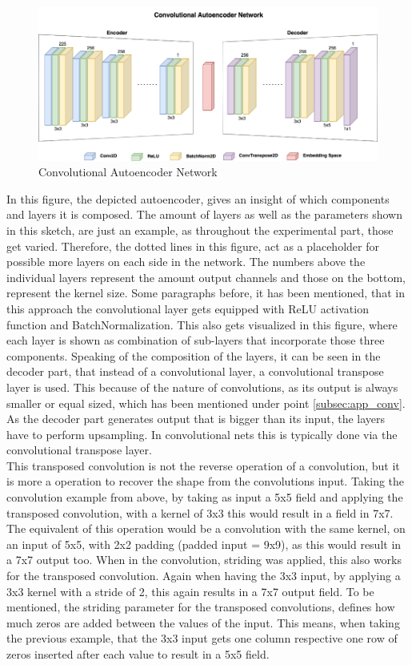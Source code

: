 \begin{figure}[htb!]
	\caption{Convolutional Autoencoder Network}
	\label{fig:app_autoencoder}
	\centering
	\includegraphics[width=\textwidth]{images/approach/autoencoder.png}
\end{figure}

In this figure, the depicted autoencoder, gives an insight of which components and layers it is composed. The amount of layers as well as the parameters shown in this sketch, are just an example, as throughout the experimental part, those get varied. Therefore, the dotted lines in this figure, act as a placeholder for possible more layers on each side in the network. The numbers above the individual layers represent the amount output channels and those on the bottom, represent the kernel size. Some paragraphs before, it has been mentioned, that in this approach the convolutional layer gets equipped with ReLU activation function and BatchNormalization. This also gets visualized in this figure, where each layer is shown as combination of sub-layers that incorporate those three components. Speaking of the composition of the layers, it can be seen in the decoder part, that instead of a convolutional layer, a convolutional transpose layer is used. This because of the nature of convolutions, as its output is always smaller or equal sized, which has been mentioned under point \ref{subsec:app_conv}. As the decoder part generates output that is bigger than its input, the layers have to perform upsampling. In convolutional nets this is typically done via the convolutional transpose layer.\\
This transposed convolution is not the reverse operation of a convolution, but it is more a operation to recover the shape from the convolutions input. \cite{dumoulin2018guideconv} Taking the convolution example from above, by taking as input a 5x5 field and applying the transposed convolution, with a kernel of 3x3 this would result in a field in 7x7. The equivalent of this operation would be a convolution with the same kernel, on an input of 5x5, with 2x2 padding (padded input = 9x9), as this would result in a 7x7 output too.
When in the convolution, striding was applied, this also works for the transposed convolution. Again when having the 3x3 input, by applying a 3x3 kernel with a stride of 2, this again results in a 7x7 output field. To be mentioned, the striding parameter for the transposed convolutions, defines how much zeros are added between the values of the input. This means, when taking the previous example, that the 3x3 input gets one column respective one row of zeros inserted after each value to result in a 5x5 field.

